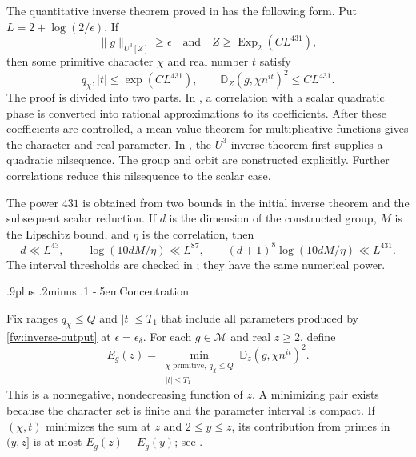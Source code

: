\documentclass[twoside]{aomart}
\makeatletter
\theoremstyle{paperplain}
\theoremstyle{paperdefinition}
\renewcommand\subsection{\@startsection{subsection}{2}{\z@}
  {.9\baselineskip plus .2\baselineskip minus .1\baselineskip}
  {-.5em}{\normalfont\bfseries}}
\newcommand{\Exp}{\operatorname{Exp}}
\numberwithin{equation}{section}
\makeatother
\begin{document}
The quantitative inverse theorem proved in  has
the following form. Put $L=2+\log(2/\epsilon)$. If
$$\|g\|_{U^3[Z]}\ge\epsilon\quad\text{and}\quad 
Z\ge\Exp_2(CL^{431}),$$ then some primitive character $\chi$ and
real number $t$ satisfy
\begin{equation}
 q_\chi,|t|\le\exp(CL^{431}),\qquad
 \mathbb D_Z(g,\chi n^{it})^2\le CL^{431}.
 \label{fw:inverse-output}
\end{equation}
The proof is divided into two parts. In , a
correlation with a scalar quadratic phase is converted into
rational approximations to its coefficients. After these
coefficients are controlled, a mean-value theorem for multiplicative
functions gives the character and real parameter. In
, the $U^3$ inverse theorem first supplies a
quadratic nilsequence. The group and orbit are constructed explicitly.
Further correlations reduce this nilsequence to the scalar case.

The power $431$ is obtained from two bounds in the initial inverse
theorem and the subsequent scalar reduction. If $d$ is the dimension
of the constructed group, $M$ is the Lipschitz bound, and $\eta$ is
the correlation, then
\begin{equation*}
 d\ll L^{43},\qquad
 \log(10dM/\eta)\ll L^{87},\qquad
 (d+1)^8\log(10dM/\eta)\ll L^{431}.
\end{equation*}
The interval thresholds are checked in
; they have the same numerical power.

\subsection{Concentration}

Fix ranges $q_\chi\le Q$ and $|t|\le T_1$ that include all
parameters produced by \eqref{fw:inverse-output} at
$\epsilon=\epsilon_\delta$. For each $g\in\mathcal M$ and real
$z\ge2$, define
\begin{equation*}
 E_g(z)=\min_{\substack{\chi\text{ primitive},\ q_\chi\le Q\\|t|\le T_1}}
       \mathbb D_z(g,\chi n^{it})^2.
\end{equation*}
This is a nonnegative, nondecreasing function of $z$. A minimizing
pair exists because the character set is finite and the parameter
interval is compact. If $(\chi,t)$ minimizes the sum at $z$ and
$2\le y\le z$, its contribution from primes in $(y,z]$ is at most
$E_g(z)-E_g(y)$; see .
\end{document}
